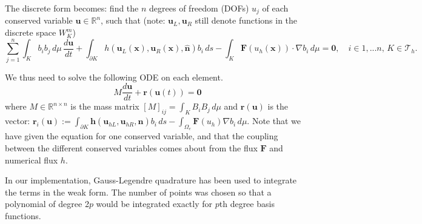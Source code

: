 \documentclass[11pt]{article}
\let\bld\boldsymbol
\begin{document}
The discrete form becomes: find the $n$ degrees of freedom (DOFs) $u_j$ of each conserved variable $\mathbf{u} \in \mathbb{R}^n$, such that (note: $\bld{u}_L, \bld{u}_R$ still denote functions in the discrete space $W_{K}^m$)
\begin{equation}
\sum_{j=1}^n\int_{K} b_ib_j\,d\mu\, \frac{d\mathbf{u}}{d t} + \int_{\partial K}  h(\bld{u}_L(\bld{x}), \bld{u}_R(\bld{x}), \hat{\bld{n}})b_i \,ds - \int_{K}\bld{F}(u_h(\bld{x}))\cdot\nabla b_i \,d\mu = \bld{0}, \quad i \in {1,...n},\, K \in \mathcal{T}_h.
\label{df}
\end{equation}

We thus need to solve the following ODE on each element.
\begin{equation}
M \frac{d\mathbf{u}}{dt} + \bld{r}(\mathbf{u}(t)) = \bld{0}
\label{ode}
\end{equation}
where $M \in \mathbb{R}^{n\times n}$ is the mass matrix $[M]_{ij} = \int_{K} B_iB_j\,d\mu$ and $\bld{r}(\mathbf{u})$ is the vector: $\bld{r}_i(\mathbf{u}) :=  \int_{\partial K}  \bld{h}(\bld{u}_{hL}, \bld{u}_{hR}, \hat{\bld{n}})b_i \,ds - \int_{\Omega_e}\bld{F}(u_h)\nabla b_i \,d\mu$. Note that we have given the equation for one conserved variable, and that the coupling between the different conserved variables comes about from the flux $\bld{F}$ and numerical flux $h$.

In our implementation, Gauss-Legendre quadrature has been used to integrate the terms in the weak form. The number of points was chosen so that a polynomial of degree 2$p$ would be integrated exactly for $p$th degree basis functions.
\end{document}
